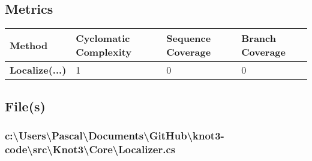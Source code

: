 \documentclass[a4paper,10pt]{article}
\begin{document}
\subsection{Metrics}
\begin{longtable}[l]{|l|l|l|l|}
\hline
\textbf{Method} & \textbf{Cyclomatic Complexity} & \textbf{Sequence Coverage} & \textbf{Branch Coverage}\\
\hline
\textbf{Localize(...)} & 1 & 0 & 0\\
\hline
\end{longtable}
\subsection{File(s)}
\subsubsection{c:\textbackslash Users\textbackslash Pascal\textbackslash Documents\textbackslash GitHub\textbackslash knot3-code\textbackslash src\textbackslash Knot3\textbackslash Core\textbackslash Localizer.cs}
\end{document}
